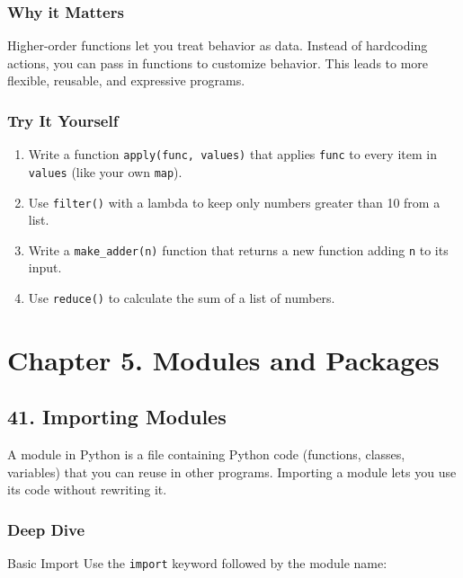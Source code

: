 \documentclass[
  letterpaper,
  DIV=11,
  numbers=noendperiod]{scrreprt}
\providecommand{\tightlist}{%
  \setlength{\itemsep}{0pt}\setlength{\parskip}{0pt}}
\begin{document}
\subsubsection{Why it Matters}\label{why-it-matters-39}

Higher-order functions let you treat behavior as data. Instead of
hardcoding actions, you can pass in functions to customize behavior.
This leads to more flexible, reusable, and expressive programs.

\subsubsection{Try It Yourself}\label{try-it-yourself-39}

\begin{enumerate}
\def\labelenumi{\arabic{enumi}.}
\tightlist
\item
  Write a function \texttt{apply(func,\ values)} that applies
  \texttt{func} to every item in \texttt{values} (like your own
  \texttt{map}).
\item
  Use \texttt{filter()} with a lambda to keep only numbers greater than
  10 from a list.
\item
  Write a \texttt{make\_adder(n)} function that returns a new function
  adding \texttt{n} to its input.
\item
  Use \texttt{reduce()} to calculate the sum of a list of numbers.
\end{enumerate}

\section{Chapter 5. Modules and
Packages}\label{chapter-5.-modules-and-packages}

\subsection{41. Importing Modules}\label{importing-modules}

A module in Python is a file containing Python code (functions, classes,
variables) that you can reuse in other programs. Importing a module lets
you use its code without rewriting it.

\subsubsection{Deep Dive}\label{deep-dive-40}

Basic Import Use the \texttt{import} keyword followed by the module
name:
\end{document}
